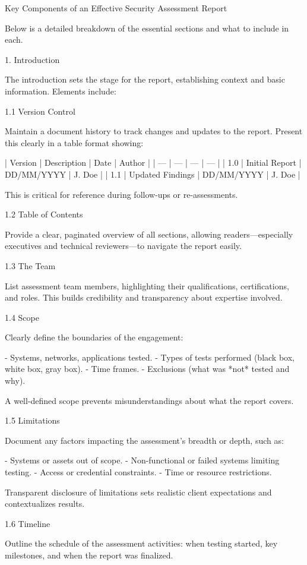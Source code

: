 Key Components of an Effective Security Assessment Report

Below is a detailed breakdown of the essential sections and what to include in each.

1. Introduction

The introduction sets the stage for the report, establishing context and basic information. Elements include:

1.1 Version Control

Maintain a document history to track changes and updates to the report. Present this clearly in a table format showing:

| Version | Description | Date | Author |
| --- | --- | --- | --- |
| 1.0 | Initial Report | DD/MM/YYYY | J. Doe |
| 1.1 | Updated Findings | DD/MM/YYYY | J. Doe |



This is critical for reference during follow-ups or re-assessments.

1.2 Table of Contents

Provide a clear, paginated overview of all sections, allowing readers—especially executives and technical reviewers—to navigate the report easily.

1.3 The Team

List assessment team members, highlighting their qualifications, certifications, and roles. This builds credibility and transparency about expertise involved.

 1.4 Scope

Clearly define the boundaries of the engagement:

- Systems, networks, applications tested.
- Types of tests performed (black box, white box, gray box).
- Time frames.
- Exclusions (what was *not* tested and why).

A well-defined scope prevents misunderstandings about what the report covers.

 1.5 Limitations

Document any factors impacting the assessment’s breadth or depth, such as:

- Systems or assets out of scope.
- Non-functional or failed systems limiting testing.
- Access or credential constraints.
- Time or resource restrictions.

Transparent disclosure of limitations sets realistic client expectations and contextualizes results.

 1.6 Timeline

Outline the schedule of the assessment activities: when testing started, key milestones, and when the report was finalized.

